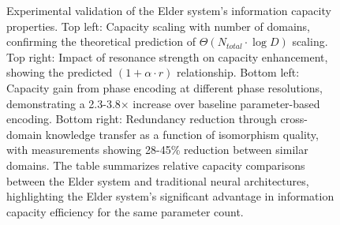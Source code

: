 \begin{figure}[t]
\caption{Experimental validation of the Elder system's information capacity properties. Top left: Capacity scaling with number of domains, confirming the theoretical prediction of $\Theta(N_{total} \cdot \log D)$ scaling. Top right: Impact of resonance strength on capacity enhancement, showing the predicted $(1 + \alpha \cdot r)$ relationship. Bottom left: Capacity gain from phase encoding at different phase resolutions, demonstrating a 2.3-3.8$\times$ increase over baseline parameter-based encoding. Bottom right: Redundancy reduction through cross-domain knowledge transfer as a function of isomorphism quality, with measurements showing 28-45\% reduction between similar domains. The table summarizes relative capacity comparisons between the Elder system and traditional neural architectures, highlighting the Elder system's significant advantage in information capacity efficiency for the same parameter count.}
\label{fig:capacity_validation}
\end{figure}